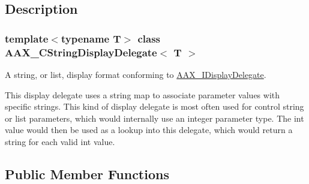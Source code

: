 \subsection{Description}
\subsubsection*{template$<$typename T$>$\newline
class A\+A\+X\+\_\+\+C\+String\+Display\+Delegate$<$ T $>$}

A string, or list, display format conforming to \mbox{\hyperlink{a01801}{A\+A\+X\+\_\+\+I\+Display\+Delegate}}. 

This display delegate uses a string map to associate parameter values with specific strings. This kind of display delegate is most often used for control string or list parameters, which would internally use an integer parameter type. The int value would then be used as a lookup into this delegate, which would return a string for each valid int value. \subsection*{Public Member Functions}
